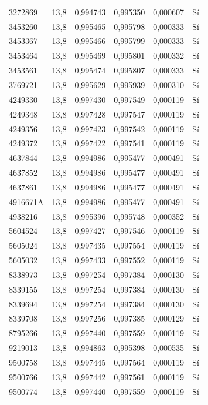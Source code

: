 \begin{longtable}{lccccc}
3272869 & 13,8 & 0,994743 & 0,995350 & 0,000607 & Sí \\
3453260 & 13,8 & 0,995465 & 0,995798 & 0,000333 & Sí \\
3453367 & 13,8 & 0,995466 & 0,995799 & 0,000333 & Sí \\
3453464 & 13,8 & 0,995469 & 0,995801 & 0,000332 & Sí \\
3453561 & 13,8 & 0,995474 & 0,995807 & 0,000333 & Sí \\
3769721 & 13,8 & 0,995629 & 0,995939 & 0,000310 & Sí \\
4249330 & 13,8 & 0,997430 & 0,997549 & 0,000119 & Sí \\
4249348 & 13,8 & 0,997428 & 0,997547 & 0,000119 & Sí \\
4249356 & 13,8 & 0,997423 & 0,997542 & 0,000119 & Sí \\
4249372 & 13,8 & 0,997422 & 0,997541 & 0,000119 & Sí \\
4637844 & 13,8 & 0,994986 & 0,995477 & 0,000491 & Sí \\
4637852 & 13,8 & 0,994986 & 0,995477 & 0,000491 & Sí \\
4637861 & 13,8 & 0,994986 & 0,995477 & 0,000491 & Sí \\
4916671A & 13,8 & 0,994986 & 0,995477 & 0,000491 & Sí \\
4938216 & 13,8 & 0,995396 & 0,995748 & 0,000352 & Sí \\
5604524 & 13,8 & 0,997427 & 0,997546 & 0,000119 & Sí \\
5605024 & 13,8 & 0,997435 & 0,997554 & 0,000119 & Sí \\
5605032 & 13,8 & 0,997433 & 0,997552 & 0,000119 & Sí \\
8338973 & 13,8 & 0,997254 & 0,997384 & 0,000130 & Sí \\
8339155 & 13,8 & 0,997254 & 0,997384 & 0,000130 & Sí \\
8339694 & 13,8 & 0,997254 & 0,997384 & 0,000130 & Sí \\
8339708 & 13,8 & 0,997256 & 0,997385 & 0,000129 & Sí \\
8795266 & 13,8 & 0,997440 & 0,997559 & 0,000119 & Sí \\
9219013 & 13,8 & 0,994863 & 0,995398 & 0,000535 & Sí \\
9500758 & 13,8 & 0,997445 & 0,997564 & 0,000119 & Sí \\
9500766 & 13,8 & 0,997442 & 0,997561 & 0,000119 & Sí \\
9500774 & 13,8 & 0,997440 & 0,997559 & 0,000119 & Sí \\
\end{longtable}
\endgroup
